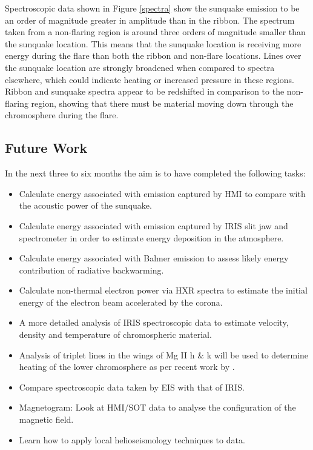 Spectroscopic data shown in Figure \ref{spectra} show the sunquake emission to be an order of magnitude greater in amplitude than in the ribbon. The spectrum taken from a non-flaring region is around three orders of magnitude smaller than the sunquake location. This means that the sunquake location is receiving more energy during the flare than both the ribbon and non-flare locations. Lines over the sunquake location are strongly broadened when compared to spectra elsewhere, which could indicate heating or increased pressure in these regions. Ribbon and sunquake spectra appear to be redshifted in comparison to the non-flaring region, showing that there must be material moving down through the chromosphere during the flare.\\


\subsection{Future Work}
In the next three to six months the aim is to have completed the following tasks:
\begin{itemize}

\item Calculate energy associated with emission captured by HMI to compare with the acoustic power of the sunquake.

\item Calculate energy associated with emission captured by IRIS slit jaw and spectrometer in order to estimate energy deposition in the atmosphere.

\item Calculate energy associated with Balmer emission to assess likely energy contribution of radiative backwarming.

\item Calculate non-thermal electron power via HXR spectra to estimate the initial energy of the electron beam accelerated by the corona.


\item A more detailed analysis of IRIS spectroscopic data to estimate velocity, density and temperature of chromospheric material.

\item Analysis of triplet lines in the wings of Mg II h \& k will be used to determine heating of the lower chromosphere as per recent work by \cite{2015arXiv150401733P}.

\item Compare spectroscopic data taken by EIS with that of IRIS.

\item Magnetogram: Look at HMI/SOT data to analyse the configuration of the magnetic field.

\item Learn how to apply local helioseismology techniques to data.

\end{itemize}
